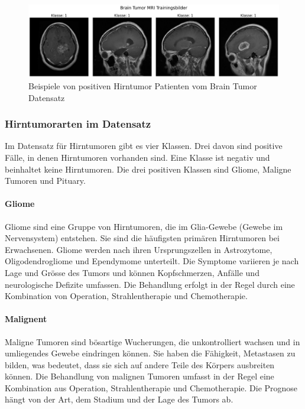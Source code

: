\begin{figure}[ht]
    \centering
    \includegraphics[width=\linewidth]{01-images/03-data/brain-klasse1.png}
    \caption{Beispiele von positiven Hirntumor Patienten vom Brain Tumor Datensatz}
    \label{fig:brain-klasse1}
\end{figure}

\newpage

\subsubsection{Hirntumorarten im Datensatz}
Im Datensatz für Hirntumoren gibt es vier Klassen. Drei davon sind positive Fälle, in denen Hirntumoren vorhanden sind. Eine Klasse ist negativ und beinhaltet keine Hirntumoren. Die drei positiven Klassen sind Gliome, Maligne Tumoren und Pituary.


\paragraph{Gliome}
Gliome sind eine Gruppe von Hirntumoren, die im Glia-Gewebe (Gewebe im Nervensystem) entstehen. Sie sind die häufigsten primären Hirntumoren bei Erwachsenen. Gliome werden nach ihren Ursprungszellen in Astrozytome, Oligodendrogliome und Ependymome unterteilt. Die Symptome variieren je nach Lage und Grösse des Tumors und können Kopfschmerzen, Anfälle und neurologische Defizite umfassen. Die Behandlung erfolgt in der Regel durch eine Kombination von Operation, Strahlentherapie und Chemotherapie.

\paragraph{Malignent}
Maligne Tumoren sind bösartige Wucherungen, die unkontrolliert wachsen und in umliegendes Gewebe eindringen können. Sie haben die Fähigkeit, Metastasen zu bilden, was bedeutet, dass sie sich auf andere Teile des Körpers ausbreiten können. Die Behandlung von malignen Tumoren umfasst in der Regel eine Kombination aus Operation, Strahlentherapie und Chemotherapie. Die Prognose hängt von der Art, dem Stadium und der Lage des Tumors ab.


